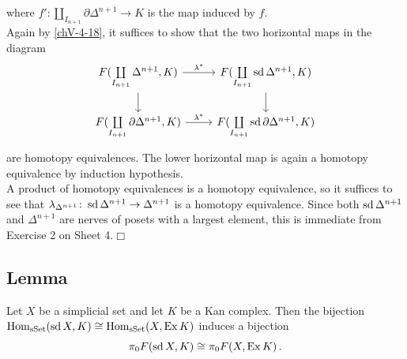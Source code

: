         where $f' \colon \coprod\limits_{I_{n+1}} \partial \Delta^{n+1} \to K$ is the map induced by $f$.\\
        Again by \ref{chV-4-18}, it suffices to show that the two horizontal maps in the diagram 
        \begin{equation*}
            \begin{tikzcd}
                F(\coprod\limits_{I_{n+1}} \Delta^{n+1}, K) \arrow[d] \arrow[r, "\lambda^{*}"] & F(\coprod\limits_{I_{n+1}} \sd \Delta^{n+1}, K) \arrow[d] \\
                F(\coprod\limits_{I_{n+1}} \partial \Delta^{n+1}, K) \arrow[r, "\lambda^{*}"] & F(\coprod\limits_{I_{n+1}} \sd \partial \Delta^{n+1}, K)
            \end{tikzcd}
        \end{equation*}
        are homotopy equivalences. The lower horizontal map is again a homotopy equivalence by induction hypothesis.\\
        A product of homotopy equivalences is a homotopy equivalence, so it suffices to see that $\lambda_{\Delta^{n+1}} \colon \operatorname{sd} \Delta^{n+1} \to \Delta^{n+1}$ is a homotopy equivalence. Since both $\operatorname{sd} \Delta^{n+1}$ and $\Delta^{n+1}$ are nerves of posets with a largest element, this is immediate from Exercise 2 on Sheet 4.\hfill$\Box$

    \subsection{Lemma}\label{chV-4-20}
        Let $X$ be a simplicial set and let $K$ be a Kan complex. Then the bijection $\operatorname{Hom}_{\operatorname{sSet}}(\operatorname{sd} X, K) \cong \operatorname{Hom}_{\operatorname{sSet}}(X, \operatorname{Ex} K)$ induces a bijection
        \begin{equation*}
            \pi_0 F(\operatorname{sd} X, K) \cong \pi_0 F(X, \operatorname{Ex} K) \,.
        \end{equation*}
        \smallskip

